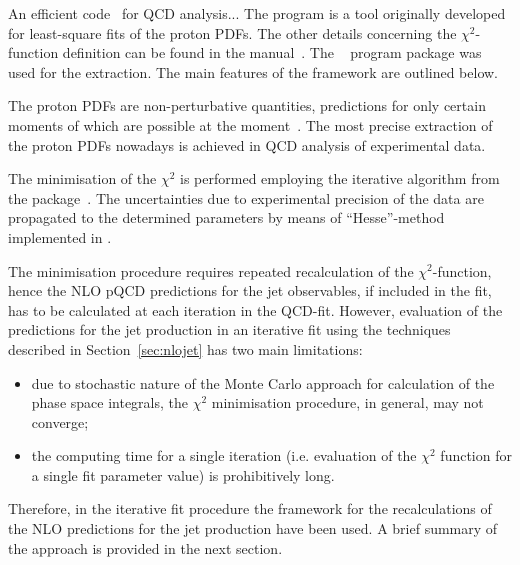 An efficient code~\cite{herafitter} for QCD analysis...  The \herafitter program is a tool originally developed for least-square fits of the proton PDFs. The other details concerning the $\chi^2$-function definition can be found in the \herafitter manual~\cite{herafitter:2014:manual}. The \herafitter~\cite{Aaron:2009aa,Aaron:2009kv} program package was used for the \as extraction. The main features of the \herafitter framework are outlined below.

The proton PDFs are non-perturbative quantities, predictions for only certain moments of which are possible at the moment~\cite{Hagler:2009ni}. The most precise extraction of the proton PDFs nowadays is achieved in QCD analysis of experimental data.

The minimisation of the $\chi^2$ is performed employing the iterative \migrad algorithm from the \minuit package~\cite{James:1975dr}. The uncertainties due to experimental precision of the data are propagated to the determined parameters by means of ``Hesse''-method implemented in \minuit.

The minimisation procedure requires repeated recalculation of the $\chi^2$-function, hence the NLO pQCD predictions for the jet observables, if included in the fit, has to be calculated at each iteration in the QCD-fit. However, evaluation of the predictions for the jet production in an iterative fit using the techniques described in Section~\ref{sec:nlojet} has two main limitations: 
\begin{itemize}
 \item due to stochastic nature of the Monte Carlo approach for calculation of the phase space integrals, the $\chi^2$ minimisation procedure,  in general, may not converge;
 \item the computing time for a single iteration (i.e. evaluation of the $\chi^2$ function for a single fit parameter value) is prohibitively long.
\end{itemize}
Therefore, in the iterative fit procedure the \fastnlo framework for the recalculations of the NLO predictions for the jet production have been used. A brief summary of the \fastnlo approach is provided in the next section. 
